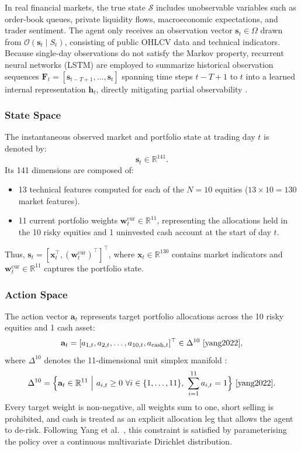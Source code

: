 \documentclass[11pt,a4paper]{article}
\numberwithin{equation}{section}
\numberwithin{table}{section}
\numberwithin{figure}{section}
\numberwithin{algorithm}{section}
\newcommand{\F}{\mathbf{F}}
\newcommand{\bs}{\mathbf{s}}
\newcommand{\ba}{\mathbf{a}}
\newcommand{\bw}{\mathbf{w}}
\begin{document}
In real financial markets, the true state $\mathcal{S}$ includes unobservable variables such as order-book queues, private liquidity flows, macroeconomic expectations, and trader sentiment. The agent only receives an observation vector $\bs_t\in\Omega$ drawn from $\mathcal{O}(\bs_t\mid S_t)$, consisting of public OHLCV data and technical indicators. Because single-day observations do not satisfy the Markov property, recurrent neural networks (LSTM) are employed to summarize historical observation sequences $\F_t=[\bs_{t-T+1},\dots,\bs_t]$ spanning time steps $t-T+1$ to $t$ into a learned internal representation $\mathbf{h}_t$, directly mitigating partial observability \cite{zou2024}.

\subsubsection{State Space}
The instantaneous observed market and portfolio state at trading day $t$ is denoted by:
\begin{equation}
\bs_t\in\mathbb{R}^{141}.
\end{equation}
Its 141 dimensions are composed of:
\begin{itemize}
\item 13 technical features computed for each of the $N=10$ equities ($13\times10=130$ market features).
\item 11 current portfolio weights $\bw_t^{\mathrm{cur}}\in\mathbb{R}^{11}$, representing the allocations held in the 10 risky equities and 1 uninvested cash account at the start of day $t$.
\end{itemize}
Thus, $\bs_t=[\mathbf{x}_t^\top,(\bw_t^{\mathrm{cur}})^\top]^\top$, where $\mathbf{x}_t\in\mathbb{R}^{130}$ contains market indicators and $\bw_t^{\mathrm{cur}}\in\mathbb{R}^{11}$ captures the portfolio state.

\subsubsection{Action Space}
The action vector $\ba_t$ represents target portfolio allocations across the 10 risky equities and 1 cash asset:
\begin{equation}
\ba_t=[a_{1,t},a_{2,t},\dots,a_{10,t},a_{\mathrm{cash},t}]^\top\in\Delta^{10}\ \cite{yang2022},
\end{equation}
where $\Delta^{10}$ denotes the 11-dimensional unit simplex manifold \cite{yang2022}:
\begin{equation}
\Delta^{10}=\Bigl\{\ba_t\in\mathbb{R}^{11}\ \Big|\ a_{i,t}\ge0\ \forall i\in\{1,\dots,11\},\ \sum_{i=1}^{11}a_{i,t}=1\Bigr\}\ \cite{yang2022}.
\end{equation}
Every target weight is non-negative, all weights sum to one, short selling is prohibited, and cash is treated as an explicit allocation leg that allows the agent to de-risk. Following Yang et al.\ \cite{yang2022}, this constraint is satisfied by parameterising the policy over a continuous multivariate Dirichlet distribution.
\end{document}
